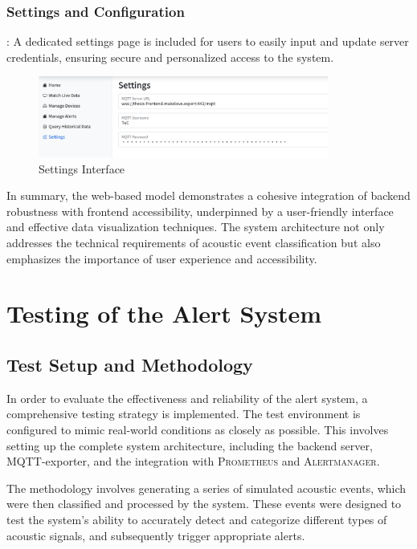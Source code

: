 \subsubsection{Settings and Configuration}: A dedicated settings page is included for users to easily input and update server credentials, ensuring secure and personalized access to the system.

\begin{figure}[htbp]
  \centering
  \includegraphics[width=0.85\textwidth]{Pictures/settings}
  \caption{\label{fig:settings}Settings Interface}
\end{figure}


In summary, the web-based model demonstrates a cohesive integration of backend robustness with frontend accessibility, underpinned by a user-friendly interface and effective data visualization techniques. The system architecture not only addresses the technical requirements of acoustic event classification but also emphasizes the importance of user experience and accessibility.

\section{Testing of the Alert System}
\subsection{Test Setup and Methodology}
In order to evaluate the effectiveness and reliability of the alert system, a comprehensive testing strategy is implemented. The test environment is configured to mimic real-world conditions as closely as possible. This involves setting up the complete system architecture, including the backend server, MQTT-exporter, and the integration with \textsc{Prometheus} and \textsc{Alertmanager}.

The methodology involves generating a series of simulated acoustic events, which were then classified and processed by the system. These events were designed to test the system's ability to accurately detect and categorize different types of acoustic signals, and subsequently trigger appropriate alerts.

